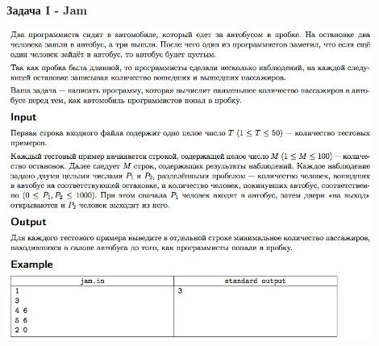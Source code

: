 \documentclass[a4paper,12pt]{article}
\begin{document}
\textbf{{\large Задача I - Jam}} \\
\begin{center}
\includegraphics[width=0.9\textwidth]{OC_Karelia/OC_Karelia_I.png}\\ [1cm]
\end{center}
\newpage
\end{document}
